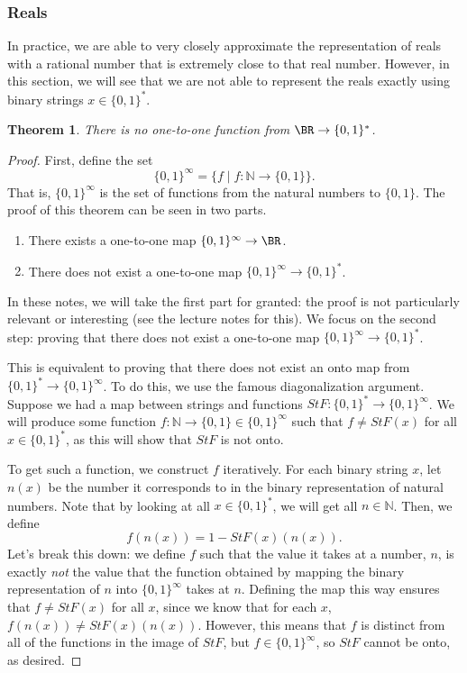 \documentclass[11pt]{article}
\newtheorem{theorem}{Theorem}
\theoremstyle{definition}
\theoremstyle{remark}
\providecommand{\tightlist}{%
  \setlength{\itemsep}{0pt}\setlength{\parskip}{0pt}}
\begin{document}
\subsubsection{Reals}
In practice, we are able to very closely approximate the representation of reals with a rational number that is extremely close to that real number. However, in this section, we will see that we are not able to represent the reals exactly using binary strings $x \in \{ 0, 1 \}^*$.
\begin{theorem}
There is no one-to-one function from $\BR \to \{ 0, 1 \}^*$.
\end{theorem}
\begin{proof}
First, define the set
\[ \{ 0, 1 \}^\infty = \{ f \mid f : \mathbb{N} \to \{ 0, 1 \} \}. \] That is, $\{0,1\}^\infty$ is the set of functions from the natural numbers to $\{0, 1\}$.
The proof of this theorem can be seen in two parts. 
\begin{enumerate}
\tightlist
\item There exists a one-to-one map $\{0,1\}^\infty \to \BR$.
\item There does not exist a one-to-one map $\{0,1\}^\infty \to \{0,1\}^*$.
\end{enumerate}
In these notes, we will take the first part for granted: the proof is not particularly relevant or interesting (see the lecture notes for this). We focus on the second step: proving that there does not exist a one-to-one map $\{0,1\}^\infty \to \{0,1\}^*$.

This is equivalent to proving that there does not exist an onto map from $\{0,1\}^* \to \{0,1\}^\infty$. To do this, we use the famous diagonalization argument. Suppose we had a map between strings and functions $StF: \{0,1\}^* \to \{0,1\}^\infty$. 
We will produce some function $f : \mathbb{N} \to \{ 0,1\} \in \{0,1\}^\infty$ such that $f \neq StF(x)$ for all $x \in \{0,1\}^*$, as this will show that $StF$ is not onto.

To get such a function, we construct $f$ iteratively. For each binary string $x$, let $n(x)$ be the number it corresponds to in the binary representation of natural numbers. Note that by looking at all $x \in \{ 0, 1 \}^*$, we will get all $n \in \mathbb{N}$. Then, we define \[ f(n(x)) = 1 - StF(x)(n(x)). \]
Let's break this down: we define $f$ such that the value it takes at a number, $n$, is exactly \emph{not} the value that the function obtained by mapping the binary representation of $n$ into $\{0,1\}^\infty$ takes at $n$. Defining the map this way ensures that $f \neq StF(x)$ for all $x$, since we know that for each $x$, $f(n(x)) \neq StF(x)(n(x))$. However, this means that $f$ is distinct from all of the functions in the image of $StF$, but $f \in \{0,1\}^\infty$, so $StF$ cannot be onto, as desired. 
\end{proof}
\end{document}
